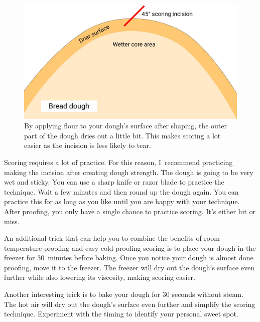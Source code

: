 \begin{figure}[htb!]
  \includegraphics[width=\textwidth]{dry-dough-surface}
  \caption[Drying the dough surface]{By applying flour to your dough's surface
      after shaping, the outer part of the dough dries out a little bit. This
      makes scoring a lot easier as the incision is less likely to tear.}%
  \label{fig:dried-out-dough-scoring}
\end{figure}


Scoring requires a lot of practice. For this reason, I~recommend
practicing making the incision after creating dough strength. The dough
is going to be very wet and sticky. You can use a sharp knife or razor
blade to practice the technique. Wait a few minutes and then round
up the dough again. You can practice this for as long as you like
until you are happy with your technique. After proofing, you only
have a single chance to practice scoring. It's either hit or miss.

An additional trick that can help you to combine the benefits
of room temperature-proofing and easy cold-proofing scoring
is to place your dough in the freezer for 30~minutes before baking.
Once you notice your dough is almost done proofing, move it to the
freezer. The freezer will dry out the dough's surface even further
while also lowering its viscosity, making scoring easier.

Another interesting trick is to bake your dough for 30 seconds without steam.
The hot air will dry out the dough's surface even further and simplify
the scoring technique. Experiment with the timing to identify your personal
sweet spot.
